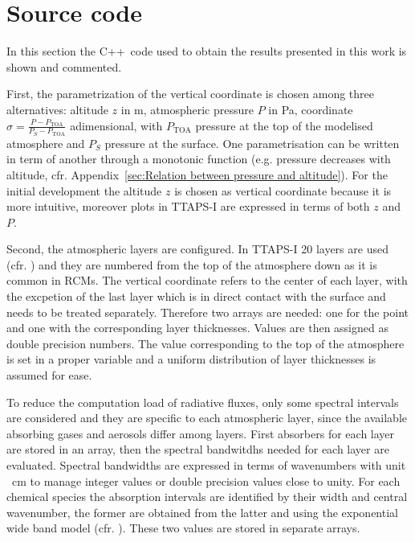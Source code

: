 \documentclass[a4paper,10pt,final,twocolumn]{article}
\newcommand{\cpp}{C++}
\newcommand{\PTOA}{P_\mathrm{TOA}}
\begin{document}
\newpage
\appendix

\section{Source code}
In this section the \cpp\ code used to obtain the results presented in this work is shown and commented.

First, the parametrization of the vertical coordinate is chosen among three alternatives: altitude $z$ in \unit{\metre}, atmospheric pressure $P$ in \unit{\pascal}, coordinate $\sigma = \frac{P - \PTOA}{P_S - \PTOA}$ adimensional, with $\PTOA$ pressure at the top of the modelised atmosphere and $P_S$ pressure at the surface. One parametrisation can be written in term of another through a monotonic function (e.g. pressure decreases with altitude, cfr. Appendix~\ref{sec:Relation between pressure and altitude}). For the initial development the altitude $z$ is chosen as vertical coordinate because it is more intuitive, moreover plots in TTAPS-I are expressed in terms of both $z$ and $P$.

Second, the atmospheric layers are configured. In TTAPS-I 20 layers are used (cfr. \cite[396]{NuclearWinterPhysics}) and they are numbered from the top of the atmosphere down as it is common in RCMs. The vertical coordinate refers to the center of each layer, with the excpetion of the last layer which is in direct contact with the surface and needs to be treated separately. %
Therefore two arrays are needed: one for the point and one with the corresponding layer thicknesses. Values are then assigned as double precision numbers. The value corresponding to the top of the atmosphere is set in a proper variable and a uniform distribution of layer thicknesses is assumed for ease.

To reduce the computation load of radiative fluxes, only some spectral intervals are considered and they are specific to each atmospheric layer, since the available absorbing gases and aerosols differ among layers. First absorbers for each layer are stored in an array, then the spectral bandwitdhs needed for each layer are evaluated. Spectral bandwidths are expressed in terms of wavenumbers with unit \unit{\per\centi\metre} to manage integer values or double precision values close to unity. For each chemical species the absorption intervals are identified by their width and central wavenumber, the former are obtained from the latter and using the exponential wide band model (cfr. \cite[360]{Modest}). These two values are stored in separate arrays.
\end{document}
